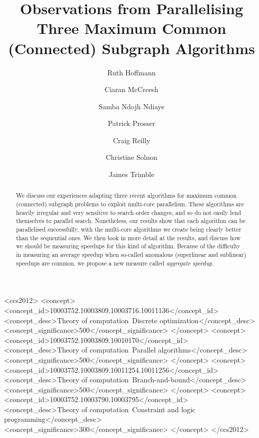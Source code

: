 \documentclass[sigconf]{acmart}
\begin{document}
\title[Observations from Parallelising Three Subgraph Algorithms]{Observations from Parallelising Three Maximum Common (Connected) Subgraph Algorithms}

\author{Ruth Hoffmann}

\author{Ciaran McCreesh}

\author{Samba Ndojh Ndiaye}

\author{Patrick Prosser}

\author{Craig Reilly}

\author{Christine Solnon}

\author{James Trimble}

\renewcommand{\shortauthors}{R. Hoffmann, C. McCreesh et al.}

\begin{abstract}
    We discuss our experiences adapting three recent algorithms for maximum common (connected)
    subgraph problems to exploit multi-core parallelism. These algorithms are heavily irregular and
    very sensitive to search order changes, and so do not easily lend themselves to parallel search.
    Nonetheless, our results show that each algorithm can be parallelised successfully, with the
    multi-core algorithms we create being clearly better than the sequential ones. We then look in
    more detail at the results, and discuss how we should be
    measuring speedups for this kind of algorithm. Because of the difficulty in measuring an
    average speedup when so-called anomalous (superlinear and sublinear) speedups are common, we
    propose a new measure called \emph{aggregate speedup}.
\end{abstract}

\begin{CCSXML}
<ccs2012>
<concept>
<concept_id>10003752.10003809.10003716.10011136</concept_id>
<concept_desc>Theory of computation~Discrete optimization</concept_desc>
<concept_significance>500</concept_significance>
</concept>
<concept>
<concept_id>10003752.10003809.10010170</concept_id>
<concept_desc>Theory of computation~Parallel algorithms</concept_desc>
<concept_significance>500</concept_significance>
</concept>
<concept>
<concept_id>10003752.10003809.10011254.10011256</concept_id>
<concept_desc>Theory of computation~Branch-and-bound</concept_desc>
<concept_significance>500</concept_significance>
</concept>
<concept>
<concept_id>10003752.10003790.10003795</concept_id>
<concept_desc>Theory of computation~Constraint and logic programming</concept_desc>
<concept_significance>300</concept_significance>
</concept>
</ccs2012>
\end{CCSXML}
\end{document}
